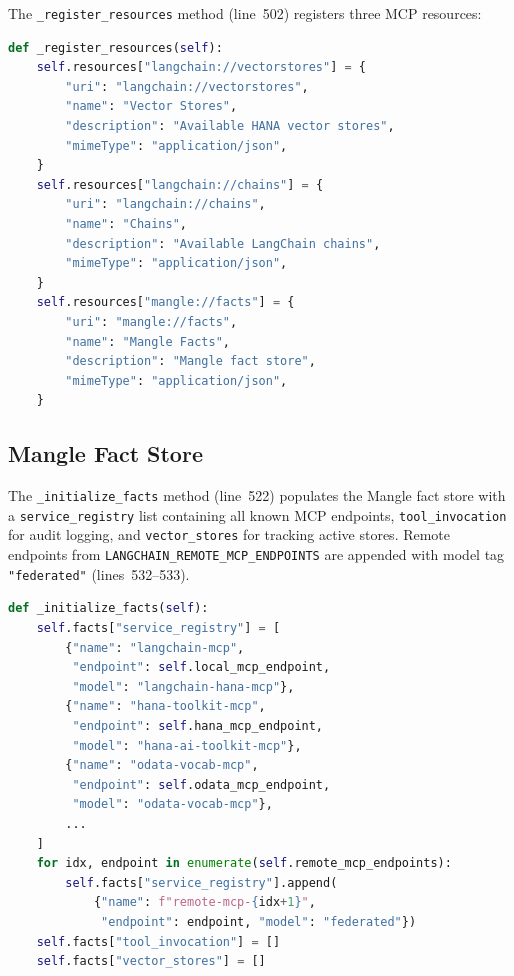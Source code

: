 \documentclass[11pt]{article}
\newcommand{\code}[1]{\texttt{#1}}
\begin{document}
The \code{\_register\_resources} method (line~502) registers three MCP resources:

\begin{lstlisting}[language=Python,caption={Resource registration (server.py lines 502--520)},label=lst:resources]
def _register_resources(self):
    self.resources["langchain://vectorstores"] = {
        "uri": "langchain://vectorstores",
        "name": "Vector Stores",
        "description": "Available HANA vector stores",
        "mimeType": "application/json",
    }
    self.resources["langchain://chains"] = {
        "uri": "langchain://chains",
        "name": "Chains",
        "description": "Available LangChain chains",
        "mimeType": "application/json",
    }
    self.resources["mangle://facts"] = {
        "uri": "mangle://facts",
        "name": "Mangle Facts",
        "description": "Mangle fact store",
        "mimeType": "application/json",
    }
\end{lstlisting}

\subsection{Mangle Fact Store}

The \code{\_initialize\_facts} method (line~522) populates the Mangle fact store
with a \code{service\_registry} list containing all known MCP endpoints,
\code{tool\_invocation} for audit logging, and \code{vector\_stores} for tracking
active stores.  Remote endpoints from \code{LANGCHAIN\_REMOTE\_MCP\_ENDPOINTS}
are appended with model tag \code{"federated"} (lines~532--533).

\begin{lstlisting}[language=Python,caption={Fact store initialization (server.py lines 522--536)},label=lst:facts]
def _initialize_facts(self):
    self.facts["service_registry"] = [
        {"name": "langchain-mcp",
         "endpoint": self.local_mcp_endpoint,
         "model": "langchain-hana-mcp"},
        {"name": "hana-toolkit-mcp",
         "endpoint": self.hana_mcp_endpoint,
         "model": "hana-ai-toolkit-mcp"},
        {"name": "odata-vocab-mcp",
         "endpoint": self.odata_mcp_endpoint,
         "model": "odata-vocab-mcp"},
        ...
    ]
    for idx, endpoint in enumerate(self.remote_mcp_endpoints):
        self.facts["service_registry"].append(
            {"name": f"remote-mcp-{idx+1}",
             "endpoint": endpoint, "model": "federated"})
    self.facts["tool_invocation"] = []
    self.facts["vector_stores"] = []
\end{lstlisting}
\end{document}
